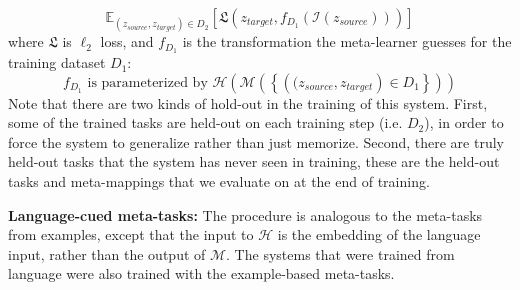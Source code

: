 \[\mathbb{E}_{(z_{source}, z_{target})\in {D}_2} \left[ \mathfrak{L}\left(z_{target}, f_{D_1}\left(\mathcal{I} \left(z_{source}\right)\right) \right)\right]\]
where $\mathfrak{L}$ is $\ell_2$ loss, and $f_{D_1}$ is the transformation the meta-learner guesses for the training dataset $D_1$:
\[f_{D_1} \text{ is parameterized by } \mathcal{H}\left(\mathcal{M}\left( \left\{\left((z_{source},z_{target}\right) \in D_1 \right\}\right)\right)\]
Note that there are two kinds of hold-out in the training of this system. First, some of the trained tasks are held-out on each training step (i.e. $D_2$), in order to force the system to generalize rather than just memorize. Second, there are truly held-out tasks that the system has never seen in training, these are the held-out tasks and meta-mappings that we evaluate on at the end of training. \par
\textbf{Language-cued meta-tasks:} The procedure is analogous to the meta-tasks from examples, except that the input to $\mathcal{H}$ is the embedding of the language input, rather than the output of $\mathcal{M}$. The systems that were trained from language were also trained with the example-based meta-tasks.\par



